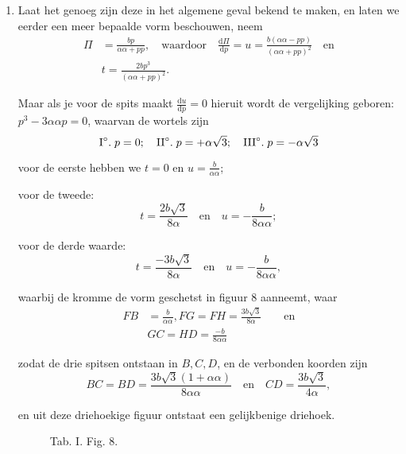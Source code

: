 \documentclass[10pt,a4paper]{article}
\newcommand{\switchenum}{\setcounter{enumi}{\arabic{enumi}-1}\switchcolumn}
\def\D{\mathrm{d}}
\begin{document}
\begin{paracol}{2}
\begin{enumerate}[topsep=1px]
		\switchenum
		\item Laat het genoeg zijn deze in het algemene geval bekend te maken, en laten we eerder een meer bepaalde vorm beschouwen, neem
		\begin{align*}
			\Pi &= \frac{bp}{\alpha \alpha + pp},\quad \text{waardoor} \quad \frac{\D \Pi}{\D p} =u = \frac{b(\alpha\alpha- pp)}{(\alpha\alpha+pp)^2}\quad \text{en}\\
			&t = \frac{2bp^3}{(\alpha \alpha+pp)^2}.
		\end{align*}
		\par Maar als je voor de spits maakt $\frac{\D u}{\D p}=0$ hieruit wordt de vergelijking geboren: $p^3-3\alpha \alpha p = 0$, waarvan de wortels zijn
		\[
			\text{I}\degree.\; p=0;\quad \text{II}\degree.\; p=+\alpha\sqrt{3};\quad  \text{III}\degree.\; p=-\alpha \sqrt{3}
		\]
		\par voor de eerste hebben we $t=0$ en $u=\frac{b}{\alpha \alpha}$;
		\par voor de tweede:
		\[
			t = \frac{2b\sqrt{3}}{8\alpha} \quad \text{en} \quad u = -\frac{b}{8\alpha \alpha};
		\]
		\par voor de derde waarde:
		\[
			t = \frac{-3b\sqrt{3}}{8\alpha} \quad \text{en} \quad u = -\frac{b}{8\alpha \alpha},
		\]
		\par waarbij de kromme de vorm geschetst in figuur 8 aanneemt, waar
		\begin{align*}
			FB &= \frac{b}{\alpha\alpha}, FG = FH = \frac{3b\sqrt{3}}{8\alpha} \qquad\text{en}\\
			&GC=HD=\frac{-b}{8\alpha \alpha}
		\end{align*}
		\par zodat de drie spitsen ontstaan in $B, C, D$, en de verbonden koorden zijn
		\[
			BC = BD = \frac{3b\sqrt{3}(1+ \alpha \alpha)}{8\alpha \alpha} \quad \text{en} \quad CD = \frac{3b\sqrt{3}}{4\alpha},
		\]
		\par en uit deze driehoekige figuur ontstaat een gelijkbenige driehoek.
	
		\switchcolumn*
		
		\begin{figure}[h]
			\centering
			\par {
				\selectfont
				\begin{tikzpicture}[rotate=180, scale=1]
				
				\end{tikzpicture}}
			\selectfont
			\caption{Tab. I. Fig. 8.}
		\end{figure}
		\switchcolumn
		\begin{figure}[h]
			\centering
			\par {
				\selectfont
				\begin{tikzpicture}[rotate=180, scale=1]
				

\end{tikzpicture}}
\end{figure}
\end{enumerate}
\end{paracol}
\end{document}
